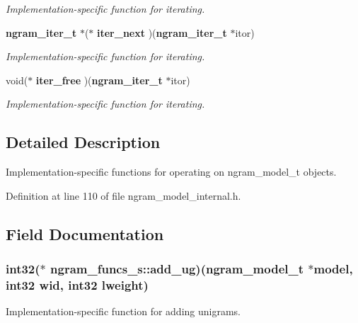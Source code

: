 \begin{DoxyCompactItemize}
\begin{DoxyCompactList}\small\item\em Implementation-\/specific function for iterating. \end{DoxyCompactList}\item 
{\bf ngram\-\_\-iter\-\_\-t} $\ast$($\ast$ {\bf iter\-\_\-next} )({\bf ngram\-\_\-iter\-\_\-t} $\ast$itor)\label{structngram__funcs__s_a57777056985f8adc3494e859c1102f3e}

\begin{DoxyCompactList}\small\item\em Implementation-\/specific function for iterating. \end{DoxyCompactList}\item 
void($\ast$ {\bf iter\-\_\-free} )({\bf ngram\-\_\-iter\-\_\-t} $\ast$itor)\label{structngram__funcs__s_ad7031e996c16516cf7f52e7a4adee4bb}

\begin{DoxyCompactList}\small\item\em Implementation-\/specific function for iterating. \end{DoxyCompactList}\end{DoxyCompactItemize}


\subsection{Detailed Description}
Implementation-\/specific functions for operating on ngram\-\_\-model\-\_\-t objects. 

Definition at line 110 of file ngram\-\_\-model\-\_\-internal.\-h.



\subsection{Field Documentation}
\subsubsection[{add\-\_\-ug}]{\setlength{\rightskip}{0pt plus 5cm}int32($\ast$ ngram\-\_\-funcs\-\_\-s\-::add\-\_\-ug)({\bf ngram\-\_\-model\-\_\-t} $\ast$model, int32 wid, int32 lweight)}\label{structngram__funcs__s_a6d553c95c7f4da4993f2b9df757ac016}


Implementation-\/specific function for adding unigrams. 


